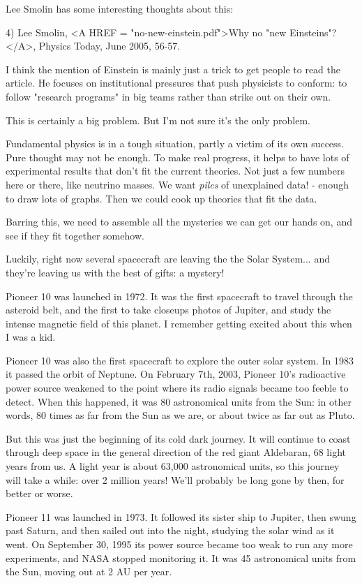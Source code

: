 Lee Smolin has some interesting thoughts about this: 

4) Lee Smolin, <A HREF = "no-new-einstein.pdf">Why no "new 
Einsteins"?</A>, Physics Today, June 2005, 56-57.

I think the mention of Einstein is mainly just a trick to get people to read the 
article.  He focuses on institutional pressures that push physicists to conform: 
to follow "research programs"
in big teams rather than strike out on their own.

This is certainly a big problem.  But I'm not sure it's the only problem.  

Fundamental physics is in a tough situation, partly a victim of its own success.
Pure thought may not be enough.  To make real progress, it helps to have lots of 
experimental results that don't fit the current theories.  Not just a few 
numbers here or there, like neutrino masses.   We want \emph{piles} of unexplained 
data! - enough to draw lots of graphs.   Then we could cook up theories that fit 
the data.

Barring this, we need to assemble all the mysteries we can get our hands on,
and see if they fit together somehow.  

Luckily, right now several spacecraft are leaving the the Solar System... 
and they're leaving us with the best of gifts: a mystery!

Pioneer 10 was launched in 1972.  It was the first spacecraft to travel through 
the asteroid belt, and the first to take closeups photos of Jupiter, and study the
intense magnetic field of this planet.  I remember getting excited about this when 
I was a kid. 

Pioneer 10 was also the first spacecraft to explore the outer solar system.
In 1983 it passed the orbit of Neptune.  On February 7th, 2003, Pioneer 10's 
radioactive power source weakened to the point where its radio signals became 
too feeble to detect.  When this happened, it was 80 astronomical units from the 
Sun: in other words, 80 times as far from the Sun as we are, or about twice as far 
out as Pluto. 

But this was just the beginning of its cold dark journey.  It will continue to coast 
through deep space in the general direction of the red giant Aldebaran, 68 light 
years from us.  A light year is about 63,000 astronomical units, so this journey 
will take a while: over 2 million years!  We'll probably be long gone by then, for 
better or worse.

Pioneer 11 was launched in 1973.  It followed its sister ship to Jupiter, then
swung past Saturn, and then sailed out into the night, studying the solar wind
as it went.  On September 30, 1995 its power source became too weak to run 
any more experiments, and NASA stopped monitoring it.   It was 45 astronomical 
units from the Sun, moving out at 2 AU per year.  

